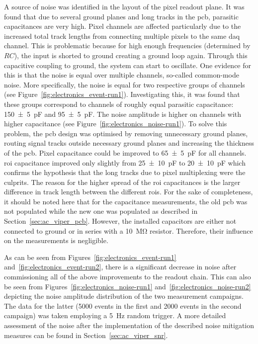 A source of noise was identified in the layout of the pixel readout plane.
It was found that due to several ground planes and long tracks in the \gls{pcb}, parasitic capacitances are very high.
Pixel channels are affected particularly due to the increased total track lengths from connecting multiple pixels to the same \gls{daq} channel.
This is problematic because for high enough frequencies (determined by $RC$), the input is shorted to ground creating a ground loop again.
Through this capacitive coupling to ground, the system can start to oscillate.
One evidence for this is that the noise is equal over multiple channels, so-called common-mode noise.
More specifically, the noise is equal for two respective groups of channels (see Figure~\ref{fig:electronics_event-run1}).
Investigating this, it was found that these groups correspond to channels of roughly equal parasitic capacitance: \SI{150 +- 5}{\pico\farad} and \SI{95 +- 5}{\pico\farad}.
The noise amplitude is higher on channels with higher capacitance (see Figure~\ref{fig:electronics_noise-run1}).
To solve this problem, the \gls{pcb} design was optimised by removing unnecessary ground planes, routing signal tracks outside necessary ground planes and increasing the thickness of the \gls{pcb}.
Pixel capacitance could be improved to \SI{65 +- 5}{\pico\farad} for all channels.
\gls{roi} capacitance improved only slightly from \SI{25 +- 10}{\pico\farad} to \SI{20 +- 10}{\pico\farad} which confirms the hypothesis that the long tracks due to pixel multiplexing were the culprits.
The reason for the higher spread of the \gls{roi} capacitances is the larger difference in track length between the different \glspl{roi}.
For the sake of completeness, it should be noted here that for the capacitance measurements, the old \gls{pcb} was not populated while the new one was populated as described in Section~\ref{sec:ac_viper_pcb}.
However, the installed capacitors are either not connected to ground or in series with a \SI{10}{\mega\ohm} resistor.
Therefore, their influence on the measurements is negligible.

As can be seen from Figures~\ref{fig:electronics_event-run1} and~\ref{fig:electronics_event-run2}, there is a significant decrease in noise after commissioning all of the above improvements to the readout chain.
This can also be seen from Figures~\ref{fig:electronics_noise-run1} and~\ref{fig:electronics_noise-run2} depicting the noise amplitude distribution of the two measurement campaigns.
The data for the latter (\num{5000} events in the first and \num{2000} events in the second campaign) was taken employing a \SI{5}{\hertz} random trigger.
A more detailed assessment of the noise after the implementation of the described noise mitigation measures can be found in Section~\ref{sec:ac_viper_snr}.

